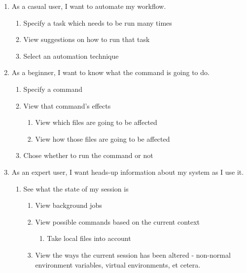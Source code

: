 \begin{enumerate}
  \item As a casual user, I want to automate my workflow.
  \begin{enumerate}
    \item Specify a task which needs to be run many times
    \item View suggestions on how to run that task
    \item Select an automation technique
  \end{enumerate}

  \item As a beginner, I want to know what the command is going to do.
  \begin{enumerate}
    \item Specify a command
    \item View that command’s effects
    \begin{enumerate}
      \item View which files are going to be affected
      \item View how those files are going to be affected
    \end{enumerate}
    \item Chose whether to run the command or not
  \end{enumerate}

  \item As an expert user, I want heads-up information about my system as I use it.
  \begin{enumerate}
    \item See what the state of my session is
    \begin{enumerate}
      \item View background jobs
      \item View possible commands based on the current context
      \begin{enumerate}
        \item Take local files into account
      \end{enumerate}
      \item View the ways the current session has been altered - non-normal
      environment variables, virtual environments, et cetera.
    \end{enumerate}
  \end{enumerate}
\end{enumerate}
